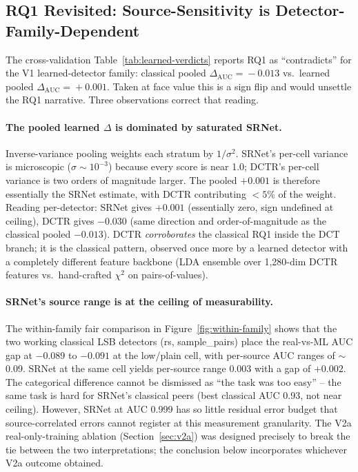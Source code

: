 \documentclass[10pt,twocolumn,a4paper]{article}
\begin{document}
\subsection{RQ1 Revisited: Source-Sensitivity is Detector-Family-Dependent}
\label{sec:disc-rq1-revisited}

The cross-validation Table~\ref{tab:learned-verdicts} reports RQ1 as ``contradicts'' for the V1 learned-detector family: classical pooled $\Delta_\text{AUC}\!=\!-0.013$ vs.\ learned pooled $\Delta_\text{AUC}\!=\!+0.001$. Taken at face value this is a sign flip and would unsettle the RQ1 narrative. Three observations correct that reading.

\paragraph{The pooled learned $\Delta$ is dominated by saturated SRNet.} Inverse-variance pooling weights each stratum by $1/\sigma^2$. SRNet's per-cell variance is microscopic ($\sigma\!\sim\!10^{-3}$) because every score is near 1.0; DCTR's per-cell variance is two orders of magnitude larger. The pooled $+0.001$ is therefore essentially the SRNet estimate, with DCTR contributing $<\!5\%$ of the weight. Reading per-detector: SRNet gives $+0.001$ (essentially zero, sign undefined at ceiling), DCTR gives $-0.030$ (same direction and order-of-magnitude as the classical pooled $-0.013$). DCTR \emph{corroborates} the classical RQ1 inside the DCT branch; it is the classical pattern, observed once more by a learned detector with a completely different feature backbone (LDA ensemble over 1{,}280-dim DCTR features vs.\ hand-crafted $\chi^2$ on pairs-of-values).

\paragraph{SRNet's source range is at the ceiling of measurability.} The within-family fair comparison in Figure~\ref{fig:within-family} shows that the two working classical LSB detectors (rs, sample\_pairs) place the real-vs-ML AUC gap at $-0.089$ to $-0.091$ at the low/plain cell, with per-source AUC ranges of $\sim$0.09. SRNet at the same cell yields per-source range 0.003 with a gap of $+0.002$. The categorical difference cannot be dismissed as ``the task was too easy'' -- the same task is hard for SRNet's classical peers (best classical AUC 0.93, not near ceiling). However, SRNet at AUC 0.999 has so little residual error budget that source-correlated errors cannot register at this measurement granularity. The V2a real-only-training ablation (Section~\ref{sec:v2a}) was designed precisely to break the tie between the two interpretations; the conclusion below incorporates whichever V2a outcome obtained.
\end{document}
